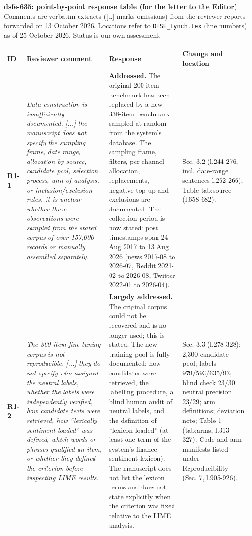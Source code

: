 \documentclass[10pt]{article}
\begin{document}
\noindent\textbf{dsfe-635: point-by-point response table (for the letter to the Editor)}\\
\small Comments are verbatim extracts ([\dots] marks omissions) from the reviewer reports forwarded on 13 October 2026. Locations refer to \texttt{DFSE\_Lynch.tex} (line numbers) as of 25 October 2026. Status is our own assessment.
\footnotesize
\begin{longtable}{>{\raggedright\arraybackslash}p{1.1cm}>{\raggedright\arraybackslash}p{8.2cm}>{\raggedright\arraybackslash}p{9.0cm}>{\raggedright\arraybackslash}p{6.0cm}}
\toprule
\textbf{ID} & \textbf{Reviewer comment} & \textbf{Response} & \textbf{Change and location}\\ \midrule\endhead
\textbf{R1-1} & \emph{Data construction is insufficiently documented. [...] the manuscript does not specify the sampling frame, date range, allocation by source, candidate pool, selection process, unit of analysis, or inclusion/exclusion rules. It is unclear whether these observations were sampled from the stated corpus of over 150,000 records or manually assembled separately.} & \textbf{Addressed.} The original 200-item benchmark has been replaced by a new 338-item benchmark sampled at random from the system's database. The sampling frame, filters, per-channel allocation, replacements, negative top-up and exclusions are documented. The collection period is now stated: post timestamps span 24 Aug 2017 to 13 Aug 2026 (news 2017-08 to 2026-07, Reddit 2021-02 to 2026-08, Twitter 2022-01 to 2026-04). & Sec. 3.2 (l.244-276, incl. date-range sentences l.262-266); Table tab:source (l.658-682). \\ \midrule
\textbf{R1-2} & \emph{The 300-item fine-tuning corpus is not reproducible. [...] they do not specify who assigned the neutral labels, whether the labels were independently verified, how candidate texts were retrieved, how ``lexically sentiment-loaded'' was defined, which words or phrases qualified an item, or whether they defined the criterion before inspecting LIME results.} & \textbf{Largely addressed.} The original corpus could not be recovered and is no longer used; this is stated. The new training pool is fully documented: how candidates were retrieved, the labelling procedure, a blind human audit of neutral labels, and the definition of ``lexicon-loaded'' (at least one term of the system's finance sentiment lexicon). The manuscript does not list the lexicon terms and does not state explicitly when the criterion was fixed relative to the LIME analysis. & Sec. 3.3 (l.278-328): 2,300-candidate pool; labels 979/593/635/93; blind check 23/30, neutral precision 23/29; arm definitions; deviation note; Table 1 (tab:arms, l.313-327). Code and arm manifests listed under Reproducibility (Sec. 7, l.905-926). \\ \midrule

\end{longtable}
\end{document}
